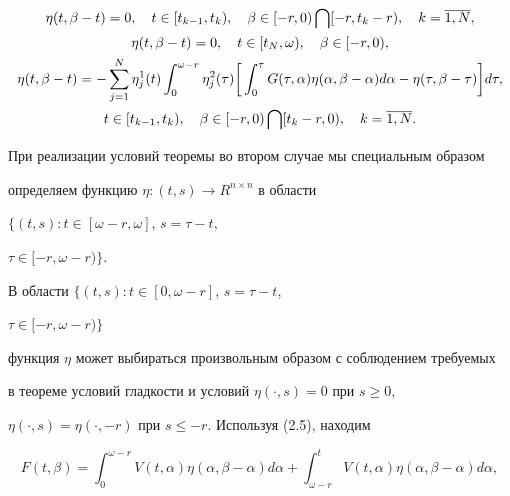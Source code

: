 \begin{gather}


\eta(t, \beta-t) =0, \quad t


\in[t_{k-1},t_{k}), \quad \beta \in[-r,0) \bigcap[-r,t_{k} -r),


\quad k= \overline{1,N},\notag \\


\eta(t, \beta-t) =0, \quad t


\in[t_{N}, \omega), \quad \beta \in[-r,0),\notag \\


\eta(t, \beta-t) =


-\sum_{j=1}^{N} \eta_{j}^{1}(t) \int_{0}^{\omega-r}


\eta_{j}^{2}(\tau)


\bigg[\int_{0}^{\tau}G(\tau, \alpha) \eta(\alpha, \beta- \alpha)


d \alpha - \eta(\tau, \beta- \tau)\bigg] d \tau, \notag \\


t \in[t_{k-1},t_{k}), \quad \beta \in[-r,0)


\bigcap[t_{k} -r,0), \quad k= \overline{1,N}.


\end{gather}





При реализации условий теоремы во втором случае мы специальным образом


определяем функцию $ \eta : (t,s) \rightarrow R^{n \times n}$ в области


$ \{(t,s) : t \in[\omega-r, \omega]$, $s= \tau -t$,


$\tau \in[-r, \omega-r) \}$.


В области $ \{(t,s) : t \in[0, \omega-r]$, $s= \tau-t$,


$\tau \in[-r, \omega-r) \}$


функция $ \eta$ может выбираться произвольным образом с соблюдением требуемых


в теореме условий гладкости и условий $\eta(\cdot,s) =0$ при $s \geq0$,


$ \eta(\cdot,s) = \eta(\cdot,-r)$ при $s \leq -r$. Используя (2.5), находим


\begin{equation}


F(t, \beta) = \int_{0}^{\omega-r} V(t, \alpha) \eta (\alpha, \beta- \alpha)


d \alpha+ \int_{\omega-r}^{t} V(t, \alpha) \eta (\alpha, \beta- \alpha)


d \alpha,


\end{equation}


